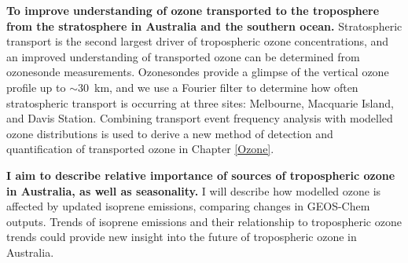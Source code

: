   \textbf{To improve understanding of ozone transported to the troposphere from the stratosphere in Australia and the southern ocean.}
  Stratospheric transport is the second largest driver of tropospheric ozone concentrations, and an improved understanding of transported ozone can be determined from ozonesonde measurements.
  Ozonesondes provide a glimpse of the vertical ozone profile up to $\sim 30$~km, and we use a Fourier filter to determine how often stratospheric transport is occurring at three sites: Melbourne, Macquarie Island, and Davis Station. 
  Combining transport event frequency analysis with modelled ozone distributions is used to derive a new method of detection and quantification of transported ozone in Chapter \ref{Ozone}.
  
  
  \textbf{I aim to describe relative importance of sources of tropospheric ozone in Australia, as well as seasonality.}
  I will describe how modelled ozone is affected by updated isoprene emissions, comparing changes in GEOS-Chem outputs.
  Trends of isoprene emissions and their relationship to tropospheric ozone trends could provide new insight into the future of tropospheric ozone in Australia.
  
